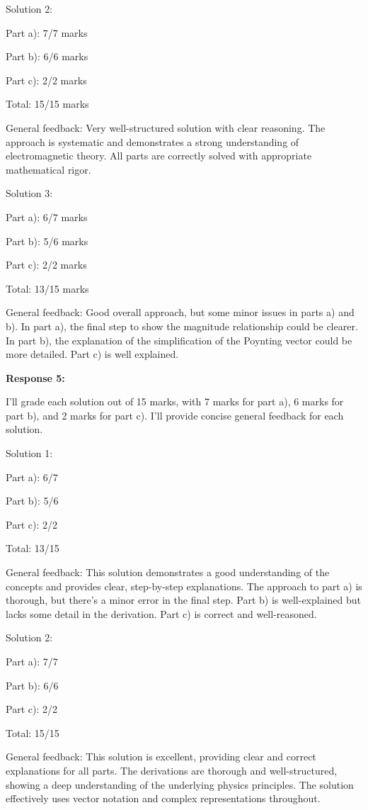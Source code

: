 \documentclass[a4paper,11pt]{article}
\begin{document}
Solution 2:

Part a): 7/7 marks

Part b): 6/6 marks

Part c): 2/2 marks

Total: 15/15 marks

General feedback: Very well-structured solution with clear reasoning. The approach is systematic and demonstrates a strong understanding of electromagnetic theory. All parts are correctly solved with appropriate mathematical rigor.

Solution 3:

Part a): 6/7 marks

Part b): 5/6 marks

Part c): 2/2 marks

Total: 13/15 marks

General feedback: Good overall approach, but some minor issues in parts a) and b). In part a), the final step to show the magnitude relationship could be clearer. In part b), the explanation of the simplification of the Poynting vector could be more detailed. Part c) is well explained.

\bigskip
\textbf{Response 5:}

I'll grade each solution out of 15 marks, with 7 marks for part a), 6 marks for part b), and 2 marks for part c). I'll provide concise general feedback for each solution.

Solution 1:

Part a): 6/7

Part b): 5/6

Part c): 2/2

Total: 13/15

General feedback: This solution demonstrates a good understanding of the concepts and provides clear, step-by-step explanations. The approach to part a) is thorough, but there's a minor error in the final step. Part b) is well-explained but lacks some detail in the derivation. Part c) is correct and well-reasoned.

Solution 2:

Part a): 7/7

Part b): 6/6

Part c): 2/2

Total: 15/15

General feedback: This solution is excellent, providing clear and correct explanations for all parts. The derivations are thorough and well-structured, showing a deep understanding of the underlying physics principles. The solution effectively uses vector notation and complex representations throughout.
\end{document}
